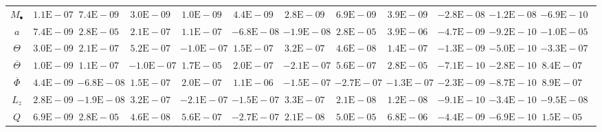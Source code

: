 \begin{sidewaystable}[htbp]\footnotesize
\centering
\begin{tabular}{cD{.}{.}{2.5}D{.}{.}{2.5}D{.}{.}{2.5}D{.}{.}{2.5}D{.}{.}{2.5}D{.}{.}{2.5}D{.}{.}{2.5}D{.}{.}{2.5}D{.}{.}{2.5}D{.}{.}{2.5}D{.}{.}{2.5}c}
\toprule
&  &  &  &  &  &  &  &  &  &  &  \\ \midrule
$M_\bullet$ & $1.1\mathrm{E}-07$ & $7.4\mathrm{E}-09$ & $3.0\mathrm{E}-09$ & $1.0\mathrm{E}-09$ & $4.4\mathrm{E}-09$ & $2.8\mathrm{E}-09$ & $6.9\mathrm{E}-09$ & $3.9\mathrm{E}-09$ & $-2.8\mathrm{E}-08$ & $-1.2\mathrm{E}-08$ & $-6.9\mathrm{E}-10$ \\
$a$ & $7.4\mathrm{E}-09$ & $2.8\mathrm{E}-05$ & $2.1\mathrm{E}-07$ & $1.1\mathrm{E}-07$ & $-6.8\mathrm{E}-08$ & $-1.9\mathrm{E}-08$ & $2.8\mathrm{E}-05$ & $3.9\mathrm{E}-06$ & $-4.7\mathrm{E}-09$ & $-9.2\mathrm{E}-10$ & $-1.0\mathrm{E}-05$ \\
$\Theta$ & $3.0\mathrm{E}-09$ & $2.1\mathrm{E}-07$ & $5.2\mathrm{E}-07$ & $-1.0\mathrm{E}-07$ & $1.5\mathrm{E}-07$ & $3.2\mathrm{E}-07$ & $4.6\mathrm{E}-08$ & $1.4\mathrm{E}-07$ & $-1.3\mathrm{E}-09$ & $-5.0\mathrm{E}-10$ & $-3.3\mathrm{E}-07$ \\
$\overline{\Theta}$ & $1.0\mathrm{E}-09$ & $1.1\mathrm{E}-07$ & $-1.0\mathrm{E}-07$ & $1.7\mathrm{E}-05$ & $2.0\mathrm{E}-07$ & $-2.1\mathrm{E}-07$ & $5.6\mathrm{E}-07$ & $2.8\mathrm{E}-05$ & $-7.1\mathrm{E}-10$ & $-2.8\mathrm{E}-10$ & $8.4\mathrm{E}-07$ \\
$\overline{\Phi}$ & $4.4\mathrm{E}-09$ & $-6.8\mathrm{E}-08$ & $1.5\mathrm{E}-07$ & $2.0\mathrm{E}-07$ & $1.1\mathrm{E}-06$ & $-1.5\mathrm{E}-07$ & $-2.7\mathrm{E}-07$ & $-1.3\mathrm{E}-07$ & $-2.3\mathrm{E}-09$ & $-8.7\mathrm{E}-10$ & $8.9\mathrm{E}-07$ \\
$L_z$ & $2.8\mathrm{E}-09$ & $-1.9\mathrm{E}-08$ & $3.2\mathrm{E}-07$ & $-2.1\mathrm{E}-07$ & $-1.5\mathrm{E}-07$ & $3.3\mathrm{E}-07$ & $2.1\mathrm{E}-08$ & $1.2\mathrm{E}-08$ & $-9.1\mathrm{E}-10$ & $-3.4\mathrm{E}-10$ & $-9.5\mathrm{E}-08$ \\
$Q$ & $6.9\mathrm{E}-09$ & $2.8\mathrm{E}-05$ & $4.6\mathrm{E}-08$ & $5.6\mathrm{E}-07$ & $-2.7\mathrm{E}-07$ & $2.1\mathrm{E}-08$ & $5.0\mathrm{E}-05$ & $6.8\mathrm{E}-06$ & $-4.4\mathrm{E}-09$ & $-6.9\mathrm{E}-10$ & $1.5\mathrm{E}-05$ \\

\end{tabular}
\end{sidewaystable}
